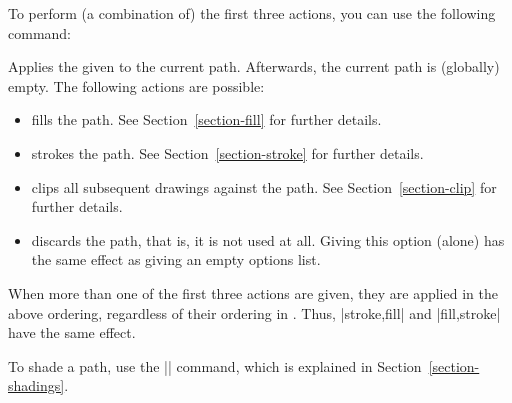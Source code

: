 To perform (a combination of) the first three actions, you can use the
following command:
\begin{command}{\pgfusepath{}}
  Applies the given  to the current path. Afterwards,
  the current path is (globally) empty. The following actions are
  possible:
  \begin{itemize}
  \item {}
    fills the path. See Section~\ref{section-fill} for further details.
\begin{codeexample}[]
\begin{pgfpicture}
  \pgfpathmoveto{\pgfpointorigin}
  \pgfpathlineto{\pgfpoint{1cm}{1cm}}
  \pgfpathlineto{\pgfpoint{1cm}{0cm}}
\end{pgfpicture}
\end{codeexample}
  \item {}
    strokes the path. See Section~\ref{section-stroke} for further details.
\begin{codeexample}[]
\begin{pgfpicture}
  \pgfpathmoveto{\pgfpointorigin}
  \pgfpathlineto{\pgfpoint{1cm}{1cm}}
  \pgfpathlineto{\pgfpoint{1cm}{0cm}}
\end{pgfpicture}
\end{codeexample}
  \item {}
    clips all subsequent drawings against the path. See
    Section~\ref{section-clip} for further details.
\begin{codeexample}[]
\begin{pgfpicture}
  \pgfpathmoveto{\pgfpointorigin}
  \pgfpathlineto{\pgfpoint{1cm}{1cm}}
  \pgfpathlineto{\pgfpoint{1cm}{0cm}}
  \pgfpathcircle{\pgfpoint{1cm}{1cm}}{0.5cm}
\end{pgfpicture}
\end{codeexample}
  \item {}
    discards the path, that is, it is not used at all. Giving this
    option (alone) has the same effect as giving an empty options
    list.
  \end{itemize}
  When more than one of the first three actions are given, they are
  applied in the above ordering, regardless of their ordering in
  . Thus, |{stroke,fill}| and |{fill,stroke}| have the
  same effect. 
\end{command}

To shade a path, use the |\pgfshadepath| command, which is explained
in Section~\ref{section-shadings}.



